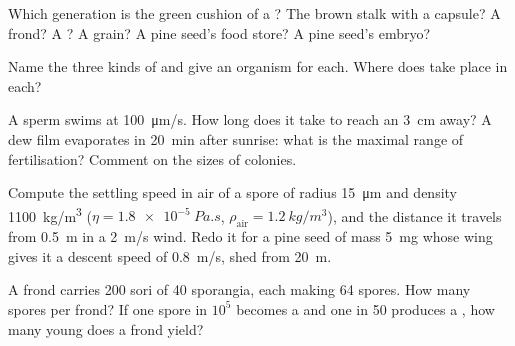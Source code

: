 \begin{exercise}[$\star$]\label{exo:b2:plant-life-cycles:3}
Which generation is the green cushion of a ? The brown stalk
with a capsule? A  frond? A ? A  grain? A pine
seed's food store? A pine seed's embryo?
\end{exercise}

\begin{exercise}[$\star$]\label{exo:b2:plant-life-cycles:4}
Name the three kinds of  and give an organism for each.
Where does  take place in each?
\end{exercise}

\begin{exercise}[$\star\star$]\label{exo:b2:plant-life-cycles:5}
A  sperm swims at \qty{100}{\micro m/s}. How long does it take to
reach an  \qty{3}{cm} away? A dew film evaporates in
\qty{20}{min} after sunrise: what is the maximal range of
fertilisation? Comment on the sizes of  colonies.
\end{exercise}

\begin{exercise}[$\star\star$]\label{exo:b2:plant-life-cycles:6}
Compute the settling speed in air of a  spore of radius
\qty{15}{\micro m} and density \qty{1100}{kg/m^3} ($\eta =
\qty{1.8e-5}{Pa.s}$, $\rho_{\text{air}} = \qty{1.2}{kg/m^3}$), and
the distance it travels from \qty{0.5}{m} in a \qty{2}{m/s} wind.
Redo it for a pine seed of mass \qty{5}{mg} whose wing gives it a
descent speed of \qty{0.8}{m/s}, shed from \qty{20}{m}.
\end{exercise}

\begin{exercise}[$\star\star$]\label{exo:b2:plant-life-cycles:7}
A  frond carries \num{200} sori of \num{40} sporangia, each
 making \num{64} spores. How many spores per frond? If
one spore in $10^{5}$ becomes a  and one  in
\num{50} produces a , how many young  does a frond
yield?
\end{exercise}

